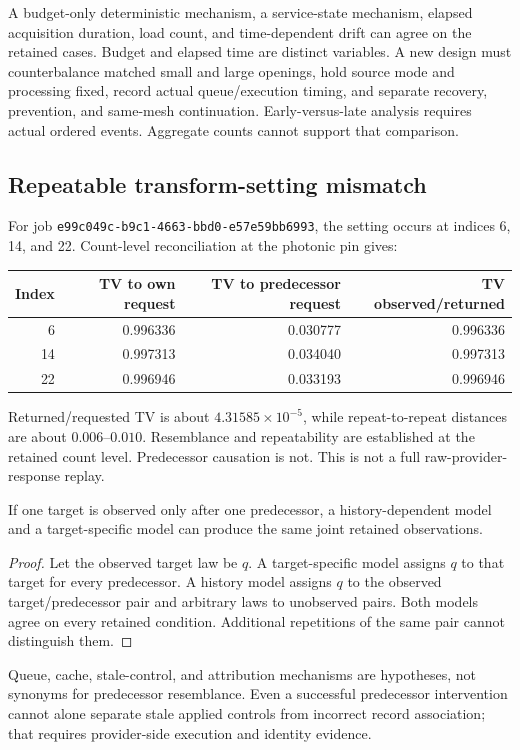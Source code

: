 \documentclass[11pt,a4paper]{article}
\begin{document}
A budget-only deterministic mechanism, a service-state mechanism, elapsed acquisition duration, load count, and time-dependent drift can agree on the retained cases. Budget and elapsed time are distinct variables. A new design must counterbalance matched small and large openings, hold source mode and processing fixed, record actual queue/execution timing, and separate recovery, prevention, and same-mesh continuation. Early-versus-late analysis requires actual ordered events. Aggregate counts cannot support that comparison.

\subsection{Repeatable transform-setting mismatch}
For job \texttt{e99c049c-b9c1-4663-bbd0-e57e59bb6993}, the setting
occurs at indices 6, 14, and 22. Count-level reconciliation at the photonic pin gives:
\begin{center}\begin{tabular}{rrrr}\toprule
Index&TV to own request&TV to predecessor request&TV observed/returned\\\midrule
6&0.996336&0.030777&0.996336\\
14&0.997313&0.034040&0.997313\\
22&0.996946&0.033193&0.996946\\\bottomrule\end{tabular}\end{center}
Returned/requested TV is about $4.31585\times10^{-5}$, while repeat-to-repeat distances are about $0.006$--$0.010$. Resemblance and repeatability are established at the retained count level. Predecessor causation is not. This is not a full raw-provider-response replay.

\begin{proposition}
If one target is observed only after one predecessor, a history-dependent model and a target-specific model can produce the same joint retained observations.
\end{proposition}
\begin{proof}
Let the observed target law be $q$. A target-specific model assigns $q$ to that target for every predecessor. A history model assigns $q$ to the observed target/predecessor pair and arbitrary laws to unobserved pairs. Both models agree on every retained condition. Additional repetitions of the same pair cannot distinguish them.
\end{proof}
Queue, cache, stale-control, and attribution mechanisms are hypotheses, not synonyms for predecessor resemblance. Even a successful predecessor intervention cannot alone separate stale applied controls from incorrect record association; that requires provider-side execution and identity evidence.
\end{document}
